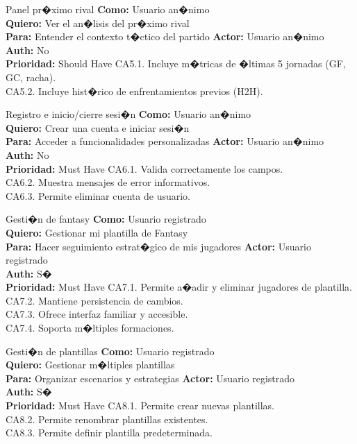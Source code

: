 {Panel pr�ximo rival}
{\textbf{Como:} Usuario an�nimo\\ \textbf{Quiero:} Ver el an�lisis del pr�ximo rival\\ \textbf{Para:} Entender el contexto t�ctico del partido}
{\textbf{Actor:} Usuario an�nimo\\ \textbf{Auth:} No\\ \textbf{Prioridad:} Should Have}
{CA5.1. Incluye m�tricas de �ltimas 5 jornadas (GF, GC, racha).\\ CA5.2. Incluye hist�rico de enfrentamientos previos (H2H).}

{Registro e inicio/cierre sesi�n}
{\textbf{Como:} Usuario an�nimo\\ \textbf{Quiero:} Crear una cuenta e iniciar sesi�n\\ \textbf{Para:} Acceder a funcionalidades personalizadas}
{\textbf{Actor:} Usuario an�nimo\\ \textbf{Auth:} No\\ \textbf{Prioridad:} Must Have}
{CA6.1. Valida correctamente los campos.\\ CA6.2. Muestra mensajes de error informativos.\\ CA6.3. Permite eliminar cuenta de usuario.}

{Gesti�n de fantasy}
{\textbf{Como:} Usuario registrado\\ \textbf{Quiero:} Gestionar mi plantilla de Fantasy\\ \textbf{Para:} Hacer seguimiento estrat�gico de mis jugadores}
{\textbf{Actor:} Usuario registrado\\ \textbf{Auth:} S�\\ \textbf{Prioridad:} Must Have}
{CA7.1. Permite a�adir y eliminar jugadores de plantilla.\\ CA7.2. Mantiene persistencia de cambios.\\ CA7.3. Ofrece interfaz familiar y accesible.\\ CA7.4. Soporta m�ltiples formaciones.}

{Gesti�n de plantillas}
{\textbf{Como:} Usuario registrado\\ \textbf{Quiero:} Gestionar m�ltiples plantillas\\ \textbf{Para:} Organizar escenarios y estrategias}
{\textbf{Actor:} Usuario registrado\\ \textbf{Auth:} S�\\ \textbf{Prioridad:} Must Have}
{CA8.1. Permite crear nuevas plantillas.\\ CA8.2. Permite renombrar plantillas existentes.\\ CA8.3. Permite definir plantilla predeterminada.}

